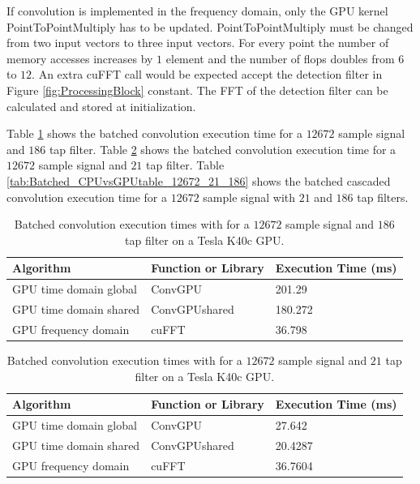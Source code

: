 If convolution is implemented in the frequency domain, only the GPU kernel PointToPointMultiply has to be updated.
PointToPointMultiply must be changed from two input vectors to three input vectors.
For every point the number of memory accesses increases by $1$ element and the number of flops doubles from $6$ to $12$.
An extra cuFFT call would be expected accept the detection filter in Figure \ref{fig:ProcessingBlock} constant.
The FFT of the detection filter can be calculated and stored at initialization.

Table \ref{tab:Batched_CPUvsGPUtable_12672_186} shows the batched convolution execution time for a $12672$ sample signal and $186$ tap filter.
Table \ref{tab:Batched_CPUvsGPUtable_12672_21} shows the batched convolution execution time for a $12672$ sample signal and $21$ tap filter.
Table \ref{tab:Batched_CPUvsGPUtable_12672_21_186} shows the batched cascaded convolution execution time for a $12672$ sample signal with $21$ and $186$ tap filters.
\begin{table}
\caption{Batched convolution execution times with for a $12672$ sample signal and $186$ tap filter on a Tesla K40c GPU.}
\begin{center}
\begin{tabular}{lll}
	\toprule
	Algorithm 				& Function or Library		& Execution Time (ms) \\ \midrule
	GPU time domain global 	& ConvGPU 					& 201.29		\\
	GPU time domain shared 	& ConvGPUshared 			& 180.272		\\
	GPU frequency domain 	& cuFFT						& 36.798 		\\ 
	\bottomrule
\end{tabular}
\end{center}
\label{tab:Batched_CPUvsGPUtable_12672_186}
\end{table}
\begin{table}
\caption{Batched convolution execution times with for a $12672$ sample signal and $21$ tap filter on a Tesla K40c GPU.}
\begin{center}
\begin{tabular}{lll}
	\toprule
	Algorithm 				& Function or Library		& Execution Time (ms) \\ \midrule
	GPU time domain global 	& ConvGPU 					& 27.642		\\
	GPU time domain shared 	& ConvGPUshared 			& 20.4287		\\
	GPU frequency domain 	& cuFFT						& 36.7604		\\ 
	\bottomrule
\end{tabular}
\end{center}
\label{tab:Batched_CPUvsGPUtable_12672_21}
\end{table}
